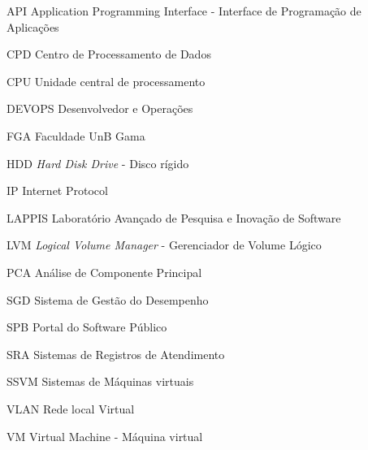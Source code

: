\begin{siglas}
  
  \item [API] Application Programming Interface - Interface de Programação de Aplicações 
  \item [CPD] Centro de Processamento de Dados
  \item [CPU] Unidade central de processamento
  \item[DEVOPS] Desenvolvedor e Operações
  \item[FGA] Faculdade UnB Gama
  \item[HDD] \textit{Hard Disk Drive} - Disco rígido
  \item[IP] Internet Protocol
  \item[LAPPIS] Laboratório Avançado de Pesquisa e Inovação de Software
  \item[LVM] \textit{Logical Volume Manager} - Gerenciador de Volume Lógico
  \item [PCA] Análise de Componente Principal
  \item[SGD] Sistema de Gestão do Desempenho
  \item[SPB] Portal do Software Público
  \item[SRA] Sistemas de Registros de Atendimento
  \item [SSVM] Sistemas de Máquinas virtuais  
  \item[VLAN] Rede local Virtual
  \item[VM] Virtual Machine - Máquina virtual

  
  
 
 
  
\end{siglas}
